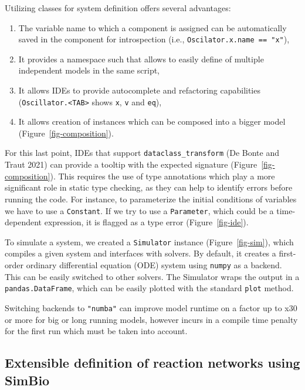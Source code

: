 \documentclass[
  a4paper,
  DIV=11,
  numbers=noendperiod]{scrartcl}
\providecommand{\tightlist}{%
  \setlength{\itemsep}{0pt}\setlength{\parskip}{0pt}}\usepackage{longtable,booktabs,array}
\begin{document}
Utilizing classes for system definition offers several advantages:

\begin{enumerate}
\def\labelenumi{\arabic{enumi}.}
\tightlist
\item
  The variable name to which a component is assigned can be
  automatically saved in the component for introspection (i.e.,
  \texttt{Oscilator.x.name\ ==\ "x"}),
\item
  It provides a namespace such that allows to easily define of multiple
  independent models in the same script,
\item
  It allows IDEs to provide autocomplete and refactoring capabilities
  (\texttt{Oscillator.\textless{}TAB\textgreater{}} shows \texttt{x},
  \texttt{v} and \texttt{eq}),
\item
  It allows creation of instances which can be composed into a bigger
  model (Figure~\ref{fig-composition}).
\end{enumerate}

For this last point, IDEs that support \texttt{dataclass\_transform} (De
Bonte and Traut 2021) can provide a tooltip with the expected signature
(Figure~\ref{fig-composition}). This requires the use of type
annotations which play a more significant role in static type checking,
as they can help to identify errors before running the code. For
instance, to parameterize the initial conditions of variables we have to
use a \texttt{Constant}. If we try to use a \texttt{Parameter}, which
could be a time-dependent expression, it is flagged as a type error
(Figure~\ref{fig-ide}).



To simulate a system, we created a \texttt{Simulator} instance
(Figure~\ref{fig-sim}), which compiles a given system and interfaces
with solvers. By default, it creates a first-order ordinary differential
equation (ODE) system using \texttt{numpy} as a backend. This can be
easily switched to other solvers. The Simulator wraps the output in a
\texttt{pandas.DataFrame}, which can be easily plotted with the standard
\texttt{plot} method.



Switching backends to \texttt{"numba"} can improve model runtime on a
factor up to x30 or more for big or long running models, however incurs
in a compile time penalty for the first run which must be taken into
account.

\hypertarget{extensible-definition-of-reaction-networks-using-simbio}{%
\subsection{Extensible definition of reaction networks using
SimBio}\label{extensible-definition-of-reaction-networks-using-simbio}}
\end{document}
